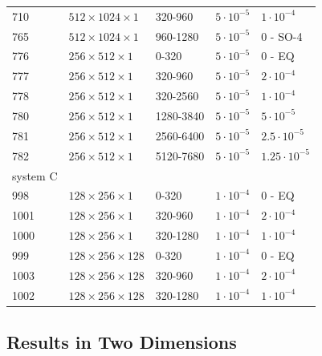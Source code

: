\documentclass[8.5pt,twoside,twocolumn]{article}
\begin{document}
\begin{table}[htp]
\begin{tabular*}{0.495\textwidth}{lllll}
710 & $512\times1024\times1$ & 320-960& $5\cdot10^{-5}$ & $1\cdot10^{-4}$ \\
765 & $512\times1024\times1$ & 960-1280& $5\cdot10^{-5}$ & 0 - SO-4 \\
\hline
776 & $256\times512\times1$ & 0-320 & $5\cdot10^{-5}$ & 0 - EQ\\
777 & $256\times512\times1$ & 320-960& $5\cdot10^{-5}$ & $2\cdot 10^{-4}$ \\
778 & $256\times512\times1$ & 320-2560& $5\cdot10^{-5}$ & $1\cdot 10^{-4}$ \\
780 & $256\times512\times1$ & 1280-3840& $5\cdot10^{-5}$ & $5\cdot 10^{-5}$ \\
781 & $256\times512\times1$ & 2560-6400& $5\cdot10^{-5}$ & $2.5\cdot 10^{-5}$ \\
782 & $256\times512\times1$ & 5120-7680& $5\cdot10^{-5}$ & $1.25\cdot 10^{-5}$ \\
\hline
system C & & & &\\
\hline
998 & $128\times256\times1$ & 0-320& $1\cdot10^{-4}$ & 0 - EQ \\
1001 & $128\times256\times1$ & 320-960& $1\cdot10^{-4}$ & $2\cdot10^{-4}$ \\
1000 & $128\times256\times1$ & 320-1280& $1\cdot10^{-4}$ & $1\cdot10^{-4}$ \\
999 & $128\times256\times128$ & 0-320 & $1\cdot10^{-4}$ & 0 - EQ\\
1003 & $128\times256\times128$ & 320-960 & $1\cdot10^{-4}$ & $2\cdot10^{-4}$\\
1002 & $128\times256\times128$ & 320-1280 & $1\cdot10^{-4}$ & $1\cdot10^{-4}$\\
\hline
\end{tabular*}
\end{table}

\subsection*{Results in Two Dimensions}
\end{document}
